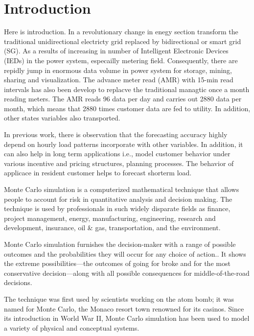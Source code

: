 \documentclass[conference]{IEEEtran}
\begin{document}
\section{Introduction}
Here is introduction.
In a revolutionary change in enegy section transform the traditional unidirectional electricty grid replaced by bidirectional or smart grid (SG).
As a results of increasing in number of Intelligent Electronic Devices (IEDs) in the power system, especailly metering field.
Consequently, there are repidly jump in enormous data volume in power system for storage, mining, sharing and visualization\cite{b1}.
The advance meter read (AMR) with 15-min read intervals has also been develop to replacve the traditional managtic once a month reading meters.
The AMR reads 96 data per day and carries out 2880 data per month, which means that 2880 times customer data are fed to utility.
In addition, other states variables also transported.


In previous work, there is observation that the forecasting accuracy highly depend on hourly load patterns incorporate with other variables\cite{b2}. In addition, it can also help in long term applications i.e., model customer behavior under various incentive and pricing structures, planning processes\cite{b4}. The behavior of applicace in resident customer helps to forecast shorterm load\cite{b6}.


Monte Carlo simulation is a computerized mathematical technique that allows people to account for risk in quantitative analysis and decision making. The technique is used by professionals in such widely disparate fields as finance, project management, energy, manufacturing, engineering, research and development, insurance, oil & gas, transportation, and the environment.

Monte Carlo simulation furnishes the decision-maker with a range of possible outcomes and the probabilities they will occur for any choice of action.. It shows the extreme possibilities—the outcomes of going for broke and for the most conservative decision—along with all possible consequences for middle-of-the-road decisions.

The technique was first used by scientists working on the atom bomb; it was named for Monte Carlo, the Monaco resort town renowned for its casinos. Since its introduction in World War II, Monte Carlo simulation has been used to model a variety of physical and conceptual systems.
\end{document}
